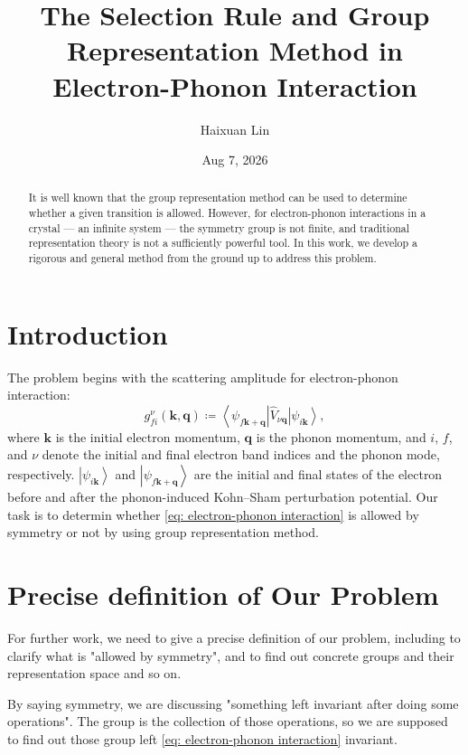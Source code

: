 \documentclass[11pt, reqno]{amsart}
\title[Selection Rule]{The Selection Rule and Group Representation Method in Electron-Phonon Interaction}
\author[H.X. Lin]{Haixuan Lin}
\date{Aug 7, 2026}
\theoremstyle{definition}
\theoremstyle{remark}
\begin{document}
\begin{abstract}
    It is well known that the group representation method can be used to determine whether a given transition is allowed. However, for electron-phonon interactions in a crystal --- an infinite system --- the symmetry group is not finite, and traditional representation theory is not a sufficiently powerful tool. In this work, we develop a rigorous and general method from the ground up to address this problem.
\end{abstract}

\maketitle



\section{Introduction}

The problem begins with the scattering amplitude for electron-phonon interaction:
\begin{equation}\label{eq: electron-phonon interaction}
    g_{fi}^{\nu}\left( \mathbf{k},\mathbf{q} \right) \coloneqq \left< \psi _{f\mathbf{k}+\mathbf{q}} \right|\hat{V}_{\nu \mathbf{q}}\left| \psi _{i\mathbf{k}} \right> ,
\end{equation}
where $\mathbf{k}$ is the initial electron momentum, $\mathbf{q}$ is the phonon momentum, and $i$, $f$, and $\nu$ denote the initial and final electron band indices and the phonon mode, respectively. $\left| \psi_{i \mathbf{k}} \right>$ and $\left| \psi_{f \mathbf{k}+\mathbf{q}} \right>$ are the initial and final states of the electron before and after the phonon-induced Kohn--Sham perturbation potential. Our task is to determin whether \eqref{eq: electron-phonon interaction} is allowed by symmetry or not by using group representation method.



\section{Precise definition of Our Problem}

For further work, we need to give a precise definition of our problem, including to clarify what is "allowed by symmetry", and to find out concrete groups and their representation space and so on.

By saying symmetry, we are discussing "something left invariant after doing some operations". The group is the collection of those operations, so we are supposed to find out those group left \eqref{eq: electron-phonon interaction} invariant.
\end{document}

